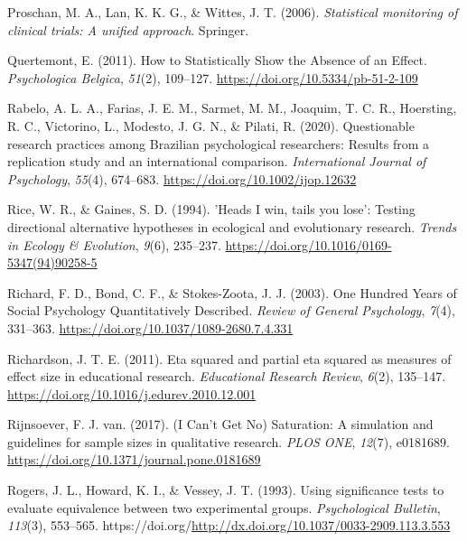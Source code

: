 \documentclass[
  letterpaper,
  DIV=11,
  numbers=noendperiod]{scrreprt}
\newlength{\cslhangindent}
\newlength{\cslentryspacingunit} %
\newenvironment{CSLReferences}[2] %
 {%
  \setlength{\parindent}{0pt}
  \ifodd #1
  \let\oldpar\par
  \def\par{\hangindent=\cslhangindent\oldpar}
  \fi
  \setlength{\parskip}{#2\cslentryspacingunit}
 }%
 {}
\begin{document}
\begin{CSLReferences}{1}{0}
\leavevmode{}%
Proschan, M. A., Lan, K. K. G., \& Wittes, J. T. (2006).
\emph{Statistical monitoring of clinical trials: A unified approach}.
{Springer}.

\leavevmode{}%
Quertemont, E. (2011). How to {Statistically Show} the {Absence} of an
{Effect}. \emph{Psychologica Belgica}, \emph{51}(2), 109--127.
\url{https://doi.org/10.5334/pb-51-2-109}

\leavevmode{}%
Rabelo, A. L. A., Farias, J. E. M., Sarmet, M. M., Joaquim, T. C. R.,
Hoersting, R. C., Victorino, L., Modesto, J. G. N., \& Pilati, R.
(2020). Questionable research practices among {Brazilian} psychological
researchers: {Results} from a replication study and an international
comparison. \emph{International Journal of Psychology}, \emph{55}(4),
674--683. \url{https://doi.org/10.1002/ijop.12632}

\leavevmode{}%
Rice, W. R., \& Gaines, S. D. (1994). '{Heads I} win, tails you lose':
Testing directional alternative hypotheses in ecological and
evolutionary research. \emph{Trends in Ecology \& Evolution},
\emph{9}(6), 235--237.
\url{https://doi.org/10.1016/0169-5347(94)90258-5}

\leavevmode{}%
Richard, F. D., Bond, C. F., \& Stokes-Zoota, J. J. (2003). One {Hundred
Years} of {Social Psychology Quantitatively Described}. \emph{Review of
General Psychology}, \emph{7}(4), 331--363.
\url{https://doi.org/10.1037/1089-2680.7.4.331}

\leavevmode{}%
Richardson, J. T. E. (2011). Eta squared and partial eta squared as
measures of effect size in educational research. \emph{Educational
Research Review}, \emph{6}(2), 135--147.
\url{https://doi.org/10.1016/j.edurev.2010.12.001}

\leavevmode{}%
Rijnsoever, F. J. van. (2017). ({I Can}'t {Get No}) {Saturation}: {A}
simulation and guidelines for sample sizes in qualitative research.
\emph{PLOS ONE}, \emph{12}(7), e0181689.
\url{https://doi.org/10.1371/journal.pone.0181689}

\leavevmode{}%
Rogers, J. L., Howard, K. I., \& Vessey, J. T. (1993). Using
significance tests to evaluate equivalence between two experimental
groups. \emph{Psychological Bulletin}, \emph{113}(3), 553--565.
https://doi.org/\url{http://dx.doi.org/10.1037/0033-2909.113.3.553}


\end{CSLReferences}
\end{document}
